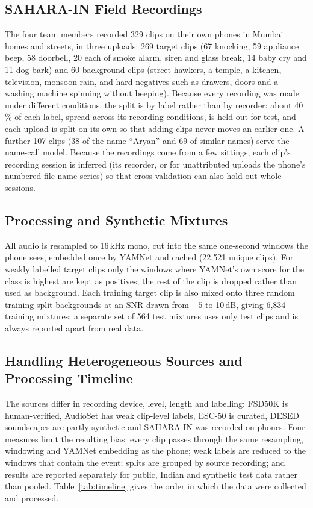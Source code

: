 \documentclass[12pt,a4paper,oneside]{report}
\begin{document}
\subsection{SAHARA-IN Field Recordings}
The four team members recorded 329 clips on their own phones in Mumbai homes and streets, in three uploads: 269 target clips (67 knocking, 59 appliance beep, 58 doorbell, 20 each of smoke alarm, siren and glass break, 14 baby cry and 11 dog bark) and 60 background clips (street hawkers, a temple, a kitchen, television, monsoon rain, and hard negatives such as drawers, doors and a washing machine spinning without beeping). Because every recording was made under different conditions, the split is by label rather than by recorder: about 40\,\% of each label, spread across its recording conditions, is held out for test, and each upload is split on its own so that adding clips never moves an earlier one. A further 107 clips (38 of the name ``Aryan'' and 69 of similar names) serve the name-call model. Because the recordings come from a few sittings, each clip's recording session is inferred (its recorder, or for unattributed uploads the phone's numbered file-name series) so that cross-validation can also hold out whole sessions.

\subsection{Processing and Synthetic Mixtures}
All audio is resampled to 16\,kHz mono, cut into the same one-second windows the phone sees, embedded once by YAMNet and cached (22,521 unique clips). For weakly labelled target clips only the windows where YAMNet's own score for the class is highest are kept as positives; the rest of the clip is dropped rather than used as background. Each training target clip is also mixed onto three random training-split backgrounds at an SNR drawn from $-5$ to 10\,dB, giving 6,834 training mixtures; a separate set of 564 test mixtures uses only test clips and is always reported apart from real data.

\subsection{Handling Heterogeneous Sources and Processing Timeline}
The sources differ in recording device, level, length and labelling: FSD50K is human-verified, AudioSet has weak clip-level labels, ESC-50 is curated, DESED soundscapes are partly synthetic and SAHARA-IN was recorded on phones. Four measures limit the resulting bias: every clip passes through the same resampling, windowing and YAMNet embedding as the phone; weak labels are reduced to the windows that contain the event; splits are grouped by source recording; and results are reported separately for public, Indian and synthetic test data rather than pooled. Table~\ref{tab:timeline} gives the order in which the data were collected and processed.
\end{document}
